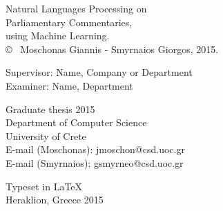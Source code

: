 \newpage
\thispagestyle{plain}
\vspace*{4.5cm}
Natural Languages Processing on\\Parliamentary Commentaries,\\using Machine Learning.\\

\copyright ~  Moschonas Giannis - Smyrnaios Giorgos, 2015. \setlength{\parskip}{1cm}

Supervisor: Name, Company or Department\\
Examiner: Name, Department \setlength{\parskip}{1cm}

Graduate thesis 2015\\	%
Department of Computer Science\\
University of Crete\\
E-mail (Moschonas): jmoschon@csd.uoc.gr\\
E-mail (Smyrnaios): gsmyrneo@csd.uoc.gr\setlength{\parskip}{0.5cm}

\vfill

Typeset in \LaTeX \\
Heraklion, Greece 2015

